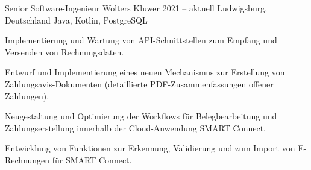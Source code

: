 \cvexperience
  {Senior Software-Ingenieur}
  {Wolters Kluwer}
  {2021 -- aktuell}
  {Ludwigsburg, Deutschland}
  {Java, Kotlin, PostgreSQL}
  {%
    \item Implementierung und Wartung von API-Schnittstellen zum Empfang und Versenden von Rechnungsdaten.
    \item Entwurf und Implementierung eines neuen Mechanismus zur Erstellung von Zahlungsavis-Dokumenten (detaillierte PDF-Zusammenfassungen offener Zahlungen).
    \item Neugestaltung und Optimierung der Workflows für Belegbearbeitung und Zahlungserstellung innerhalb der Cloud-Anwendung SMART Connect.
    \item Entwicklung von Funktionen zur Erkennung, Validierung und zum Import von E-Rechnungen für SMART Connect.
  }
